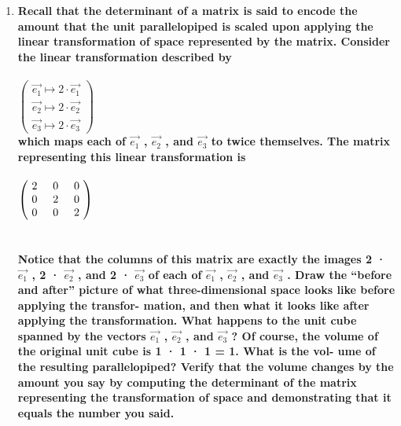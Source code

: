 \documentclass{article}
\begin{document}
\begin{enumerate}[7.]
	\item\textbf{Recall that the determinant of a matrix is said to encode the amount that the
	      unit parallelopiped is scaled upon applying the linear transformation of space
	      represented by the matrix. Consider the linear transformation described by\\\\$\left(\!\begin{array}{c}\vec{e_{1}}\mapsto2\cdot\vec{e_{1}}\\ \vec{e_{2}}\mapsto2\cdot\vec{e_{2}} \\  \vec{e_{3}}\mapsto2\cdot\vec{e_{3}}\end{array} \!\right)$\\which maps each of $\vec{e_{1}}$ , $\vec{e_{2}}$  , and $\vec{e_{3}}$  to twice themselves. The matrix representing
	      this linear transformation is\\\\$\left(\!
	      \begin{array}{c}
	      	2 \hspace{.5cm} 0 \hspace{.5cm} 0 \\
	      	0 \hspace{.5cm} 2 \hspace{.5cm} 0 \\
	      	0 \hspace{.5cm} 0 \hspace{.5cm} 2 \\
	      \end{array}
	      \!\right)$\\\\\\Notice that the columns of this matrix are exactly the images 2 · $\vec{e_{1}}$ , 2 · $\vec{e_{2}}$ , and 2 · $\vec{e_{3}}$ of each of $\vec{e_{1}}$ , $\vec{e_{2}}$ , and $\vec{e_{3}}$ . Draw the “before and after” picture of
	      what three-dimensional space looks like before applying the transfor-
	      mation, and then what it looks like after applying the transformation.
	      What happens to the unit cube spanned by the vectors $\vec{e_{1}}$ , $\vec{e_{2}}$ , and $\vec{e_{3}}$ ?
	      Of course, the volume of the original unit cube is 1 · 1 · 1 = 1. What is the vol-
	      ume of the resulting parallelopiped? Verify that the volume changes
	      by the amount you say by computing the determinant of the matrix
	      representing the transformation of space and demonstrating that it
	equals the number you said.}
\end{enumerate}
\end{document}
